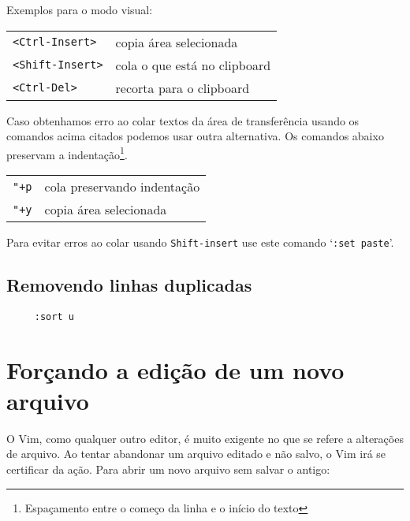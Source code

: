 Exemplos para o modo visual:

\begin{table}[htb]\begin{center} \begin{tabular}{ll} \hline
     \verb|<Ctrl-Insert>| & copia área selecionada \\
     \verb|<Shift-Insert>| & cola o que está no clipboard\\
     \verb|<Ctrl-Del>| & recorta para o clipboard\\
\hline \end{tabular}\end{center}\end{table}

Caso obtenhamos erro ao colar textos da área de transferência usando os
comandos acima citados podemos usar outra alternativa.  Os comandos abaixo
preservam a indentação\footnote{Espaçamento entre o começo da linha e o início
do texto}.

\begin{table}[htb]\begin{center} \begin{tabular}{ll} \hline
     \verb|"+p| & cola preservando indentação\\
     \verb|"+y| & copia área selecionada\\
\hline \end{tabular}\end{center}\end{table}

{\Large {}} Para evitar erros ao colar usando {\tt Shift-insert} 
use este comando `{\tt :set paste}'.

\subsection{Removendo linhas duplicadas}
\begin{verbatim}
     :sort u
\end{verbatim}

\section{Forçando a edição de um novo arquivo}\label{sec:Forçando a edição de um novo arquivo}

O Vim, como qualquer outro editor, é muito exigente no que se refere a alterações
de arquivo.  Ao tentar abandonar um arquivo editado e não salvo, o Vim irá se certificar
da ação. Para abrir um novo arquivo sem salvar o antigo:

